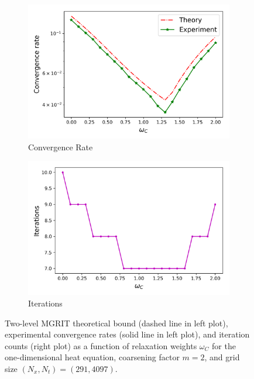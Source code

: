 \documentclass[VANCOUVER,STIX1COL]{WileyNJD-v2}
\begin{document}
\begin{figure}[h!]
    \centering
    \begin{subfigure}[b]{0.4\textwidth}
    \includegraphics[width=\textwidth]{images/heat_conv.png}
    \caption{\normalsize Convergence Rate}
    \end{subfigure}
     \begin{subfigure}[b]{0.4\textwidth}
    \includegraphics[width=\textwidth]{images/heat_iter.png}
    \caption{\normalsize Iterations}
    \end{subfigure}
    \caption{Two-level MGRIT theoretical bound (dashed line in left plot), experimental convergence rates (solid line in left plot), and iteration counts (right plot) as a function of relaxation weights $\omega_C$ for the one-dimensional heat equation, coarsening factor $m = 2$, and grid size $(N_x, N_t) = (291, 4097)$.}
    \label{fig:Heat new theoretical bound}
\end{figure}
\end{document}
